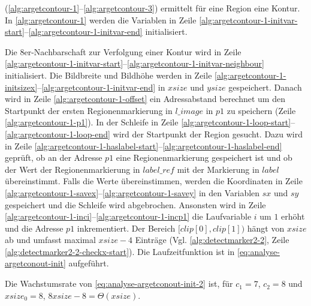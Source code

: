  (\autoref{alg:argetcontour-1}--\autoref{alg:argetcontour-3}) ermittelt für eine Region eine
 Kontur. In \autoref{alg:argetcontour-1} werden die Variablen in Zeile
 \ref{alg:argetcontour-1-initvar-start}--\ref{alg:argetcontour-1-initvar-end} initialisiert.

Die 8er-Nachbarschaft zur Verfolgung einer Kontur wird in Zeile
 \ref{alg:argetcontour-1-initvar-start}--\ref{alg:argetcontour-1-initvar-neighbour} initialisiert. Die Bildbreite und
 Bildhöhe werden in Zeile \ref{alg:argetcontour-1-initsizex}--\ref{alg:argetcontour-1-initvar-end} in $\mathit{xsize}$
 und $\mathit{ysize}$ gespeichert. Danach wird in Zeile \ref{alg:argetcontour-1-offset} ein Adressabstand berechnet um
 den Startpunkt der ersten Regionenmarkierung in $\mathit{l\_image}$ in $\mathit{p1}$ zu speichern (Zeile
 \ref{alg:argetcontour-1-p1}). In der Schleife in Zeile
 \ref{alg:argetcontour-1-loop-start}--\ref{alg:argetcontour-1-loop-end} wird der Startpunkt der Region gesucht. Dazu
 wird in Zeile \ref{alg:argetcontour-1-haslabel-start}--\ref{alg:argetcontour-1-haslabel-end} geprüft, ob an der
 Adresse $\mathit{p1}$ eine Regionenmarkierung gespeichert ist und ob der Wert der Regionenmarkierung in
 $\mathit{label\_ref}$ mit der Markierung in $\mathit{label}$ übereinstimmt. Falls die Werte übereinstimmen, werden die
 Koordinaten in Zeile \ref{alg:argetcontour-1-savex}--\ref{alg:argetcontour-1-savey} in den Variablen $\mathit{sx}$ und
 $\mathit{sy}$ gespeichert und die Schleife wird abgebrochen. Ansonsten wird in Zeile
 \ref{alg:argetcontour-1-inci}--\ref{alg:argetcontour-1-incp1} die Laufvariable $i$ um $1$ erhöht und die Adresse
 $\mathit{p1}$ inkrementiert. Der Bereich $[\mathit{clip}[0],\mathit{clip}[1])$ hängt von $\mathit{xsize}$ ab und
 umfasst maximal $\mathit{xsize} - 4$ Einträge (Vgl. \autoref{alg:detectmarker2-2}, Zeile
 \ref{alg:detectmarker2-2-checkx-start}). Die Laufzeitfunktion ist in \autoref{eq:analyse-argetconout-init} aufgeführt.

Die Wachstumsrate von \autoref{eq:analyse-argetconout-init-2} ist, für $c_{1} = 7$, $c_{2} = 8$ und
 $\mathit{xsize}_0 = 8$, $8\mathit{xsize} - 8 = \Theta(\mathit{xsize})$.


